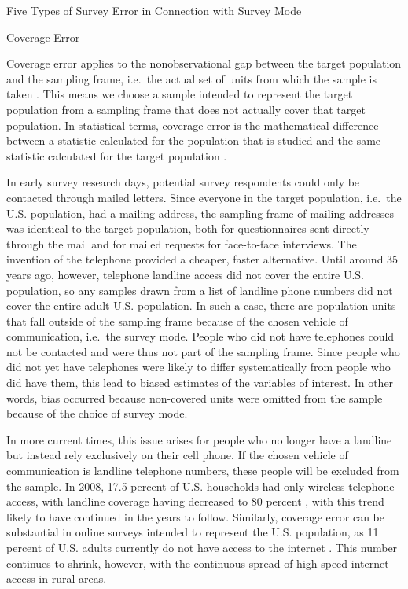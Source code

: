 \documentclass[12pt,]{article}
\makeatletter
\renewcommand\subsubsection{\@startsection{subsubsection}{3}{\z@}
                                     {-3.25ex\@plus -1ex \@minus -.2ex}
                                     {1.5ex \@plus .2ex}
                                     {\normalsize\itshape}} %
\renewcommand\paragraph{\@startsection{paragraph}{4}{\z@}
                                    {-3.25ex \@plus -1ex \@minus -.2ex}
                                    {1.5ex \@plus .2ex}
                                    {\normalsize}} %
\makeatother
\begin{document}
\subsubsection{Five Types of Survey Error in Connection with Survey
Mode}\label{mode-theory-types}

\paragraph{Coverage Error}\label{mode-theory-types-coverage}

Coverage error applies to the nonobservational gap between the target
population and the sampling frame, i.e.~the actual set of units from
which the sample is taken \citep{groves_survey_2009}. This means we
choose a sample intended to represent the target population from a
sampling frame that does not actually cover that target population. In
statistical terms, coverage error is the mathematical difference between
a statistic calculated for the population that is studied and the same
statistic calculated for the target population
\citep{weisberg_2005_total}.

In early survey research days, potential survey respondents could only
be contacted through mailed letters. Since everyone in the target
population, i.e.~the U.S. population, had a mailing address, the
sampling frame of mailing addresses was identical to the target
population, both for questionnaires sent directly through the mail and
for mailed requests for face-to-face interviews. The invention of the
telephone provided a cheaper, faster alternative. Until around 35 years
ago, however, telephone landline access did not cover the entire U.S.
population, so any samples drawn from a list of landline phone numbers
did not cover the entire adult U.S. population. In such a case, there
are population units that fall outside of the sampling frame because of
the chosen vehicle of communication, i.e.~the survey mode. People who
did not have telephones could not be contacted and were thus not part of
the sampling frame. Since people who did not yet have telephones were
likely to differ systematically from people who did have them, this lead
to biased estimates of the variables of interest. In other words, bias
occurred because non-covered units were omitted from the sample because
of the choice of survey mode.

In more current times, this issue arises for people who no longer have a
landline but instead rely exclusively on their cell phone. If the chosen
vehicle of communication is landline telephone numbers, these people
will be excluded from the sample. In 2008, 17.5 percent of U.S.
households had only wireless telephone access, with landline coverage
having decreased to 80 percent \citep{blumberg_2008_recent}, with this
trend likely to have continued in the years to follow. Similarly,
coverage error can be substantial in online surveys intended to
represent the U.S. population, as 11 percent of U.S. adults currently do
not have access to the internet \citep{pew_2018_internet}. This number
continues to shrink, however, with the continuous spread of high-speed
internet access in rural areas.
\end{document}
